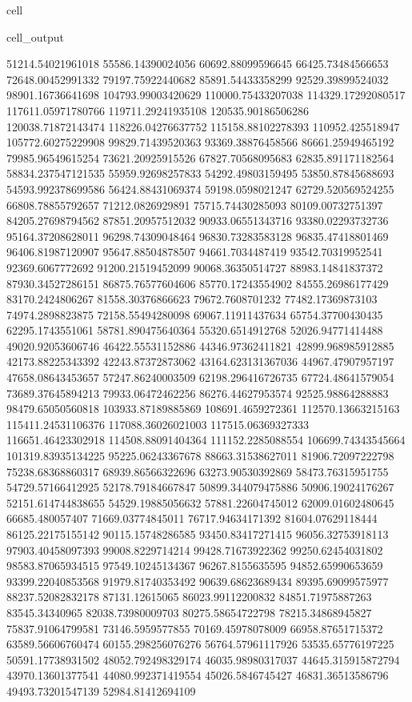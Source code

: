 \documentclass[letterpaper,10pt,english]{jupyterBook}
\begin{document}
\begin{sphinxuseclass}{cell}
\begin{sphinxVerbatimOutput}
\begin{sphinxuseclass}{cell_output}
\begin{sphinxVerbatim}[commandchars=\\\{\}]
51214.54021961018  55586.14390024056  60692.88099596645  66425.73484566653  72648.00452991332  79197.75922440682  85891.54433358299  92529.39899524032  98901.16736641698  104793.99003420629  110000.75433207038  114329.17292080517  117611.05971780766  119711.29241935108  120535.90186506286  120038.71872143474  118226.04276637752  115158.88102278393  110952.425518947  105772.60275229908  99829.71439520363  93369.38876458566  86661.25949465192  79985.96549615254  73621.20925915526  67827.70568095683  62835.891171182564  58834.237547121535  55959.92698257833  54292.49803159495  53850.87845688693  54593.992378699586  56424.88431069374  59198.0598021247  62729.520569524255  66808.78855792657  71212.0826929891  75715.74430285093  80109.00732751397  84205.27698794562  87851.20957512032  90933.06551343716  93380.02293732736  95164.37208628011  96298.74309048464  96830.73283583128  96835.47418801469  96406.81987120907  95647.88504878507  94661.7034487419  93542.70319952541  92369.6067772692  91200.21519452099  90068.36350514727  88983.14841837372  87930.34527286151  86875.76577604606  85770.17243554902  84555.26986177429  83170.2424806267  81558.30376866623  79672.7608701232  77482.17369873103  74974.2898823875  72158.55494280098  69067.11911437634  65754.37700430435  62295.1743551061  58781.890475640364  55320.6514912768  52026.94771414488  49020.92053606746  46422.55531152886  44346.97362411821  42899.968985912885  42173.88225343392  42243.87372873062  43164.623131367036  44967.47907957197  47658.08643453657  
57247.86240003509  62198.296416726735  67724.48641579054  73689.37645894213  79933.06472462256  86276.44627953574  92525.98864288883  98479.65050560818  103933.87189885869  108691.4659272361  112570.13663215163  115411.24531106376  117088.36026021003  117515.06369327333  116651.46423302918  114508.88091404364  111152.2285088554  106699.74343545664  101319.83935134225  95225.06243367678  88663.31538627011  81906.72097222798  75238.68368860317  68939.86566322696  63273.90530392869  58473.76315951755  54729.57166412925  52178.79184667847  50899.344079475886  50906.19024176267  52151.614744838655  54529.19885056632  57881.22604745012  62009.01602480645  66685.480057407  71669.03774845011  76717.94634171392  81604.07629118444  86125.22175155142  90115.15748286585  93450.83417271415  96056.32753918113  97903.40458097393  99008.8229714214  99428.71673922362  99250.62454031802  98583.87065934515  97549.10245134367  96267.8155635595  94852.65990653659  93399.22040853568  91979.81740353492  90639.68623689434  89395.69099575977  88237.52082832178  87131.12615065  86023.99112200832  84851.71975887263  83545.34340965  82038.73980009703  80275.58654722798  78215.34868945827  75837.91064799581  73146.5959577855  70169.45978078009  66958.87651715372  63589.56606760474  60155.298256076276  56764.57961117926  53535.65776197225  50591.17738931502  48052.792498329174  46035.98980317037  44645.315915872794  43970.13601377541  44080.992371419554  45026.5846745427  46831.36513586796  49493.73201547139  52984.81412694109  

\end{sphinxVerbatim}
\end{sphinxuseclass}
\end{sphinxVerbatimOutput}
\end{sphinxuseclass}
\end{document}
